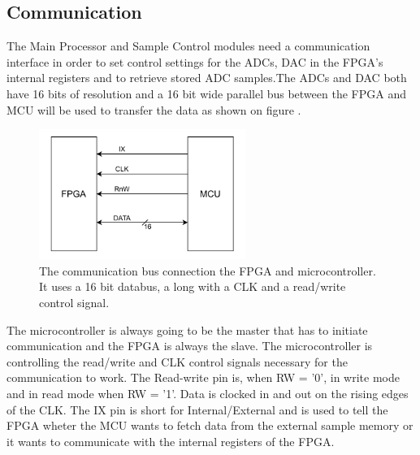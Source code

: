 \subsection{Communication} \label{subsec:Communication}
The Main Processor and Sample Control modules need a communication interface in order to set control settings for the ADCs, DAC in the FPGA's internal registers and to retrieve stored ADC samples.The ADCs and DAC  both have 16 bits of resolution and a 16 bit wide parallel bus between the FPGA and MCU will be used to transfer the data as shown on figure .

\begin{figure}[H]
    \centering
    \includegraphics[clip, trim=0 0 0 0, width=0.6\textwidth]{Sections/7_SystemDesign/Figures/CommPort_Block.pdf}
    \caption{The communication bus connection the FPGA and microcontroller. It uses a 16 bit databus, a long with a CLK and a read/write control signal.}
    \label{fig_7_2_1_CommBus}
\end{figure}

The microcontroller is always going to be the master that has to initiate communication and the FPGA is always the slave. The microcontroller is controlling the read/write and CLK control signals necessary for the communication to work. The Read-write pin is, when  RW = '0', in write mode and in read mode when RW = '1'. Data is clocked in and out on the rising edges of the CLK. The IX pin is short for Internal/External and is used to tell the FPGA wheter the MCU wants to fetch data from the external sample memory or it wants to communicate with the internal registers of the FPGA. 

